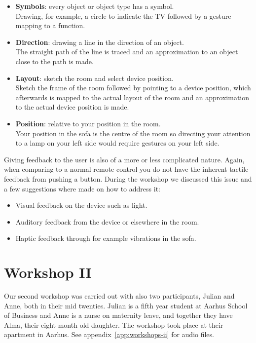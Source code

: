 \begin{itemize}
  \item{\textbf{Symbols}: every object or object type has a symbol.\\
        Drawing, for example, a circle to indicate the TV followed by a gesture mapping to a function.
  }
  \item{\textbf{Direction}: drawing a line in the direction of an object.\\
        The straight path of the line is traced and an approximation to an object close to the path is made.
  }
  \item{\textbf{Layout}: sketch the room and select device position.\\
        Sketch the frame of the room followed by pointing to a device position, which afterwards is mapped to the actual layout of the room and an approximation to the actual device position is made.
  }
  \item{\textbf{Position}: relative to your position in the room.\\
        Your position in the sofa is the centre of the room so directing your attention to a lamp on your left side would require gestures on your left side.
  }
\end{itemize}

Giving feedback to the user is also of a more or less complicated nature.
Again, when comparing to a normal remote control you do not have the inherent tactile feedback from pushing a button.
During the workshop we discussed this issue and a few suggestions where made on how to address it:
\begin{itemize}
  \item{Visual feedback on the device such as light.}
  \item{Auditory feedback from the device or elsewhere in the room.}
  \item{Haptic feedback through for example vibrations in the sofa.}
\end{itemize}

\section{Workshop II}
\label{ch:workshops:workshop-ii}
Our second workshop was carried out with also two participants, Julian and Anne, both in their mid twenties.
Julian is a fifth year student at Aarhus School of Business and Anne is a nurse on maternity leave, and together they have Alma, their eight month old daughter.
The workshop took place at their apartment in Aarhus.
See appendix~\ref{app:workshops-ii} for audio files.

